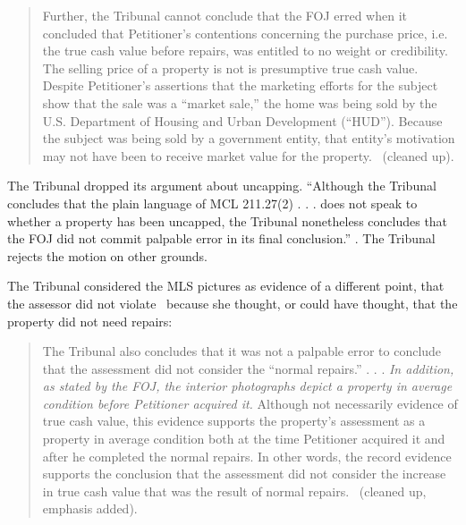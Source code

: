 \documentclass[12pt,\documentclassflag]{michiganCourtOfAppealsBrief}
\begin{document}
\begin{quote}
Further, the Tribunal cannot conclude that the FOJ erred when it
concluded that Petitioner's contentions concerning the purchase price, i.e. the true cash value before repairs, was entitled to no weight or credibility. The selling price of a property is not is presumptive true cash value. Despite Petitioner's assertions that the marketing efforts for the subject show that the sale was a ``market sale,'' the home was
being sold by the U.S. Department of Housing and Urban Development (``HUD''). Because the subject was being sold by a government entity, that entity's motivation may not have been to receive market value for the property. \reconsiderationDenied[2]\ (cleaned up).
\end{quote}

The Tribunal dropped its argument about uncapping. ``Although the Tribunal concludes that the plain language of MCL 211.27(2) . . . does not speak to whether a property has been uncapped, the Tribunal nonetheless concludes that the FOJ did not commit palpable error in its final conclusion.'' \reconsiderationDenied[1-2]. The Tribunal rejects the motion on other grounds. 

The Tribunal considered the MLS pictures as evidence of a different point, that the assessor did not violate \mathieuGast\ because she thought, or could have thought, that the property did not need repairs:

\begin{quote}
  The Tribunal also concludes that it was not a palpable error to conclude that the assessment did not consider the ``normal repairs.'' . . .
  {\em In addition, as stated by the FOJ, the interior photographs depict a property in average condition before Petitioner acquired it.} Although not necessarily evidence of true cash value, this evidence supports the property's assessment as a property in average condition both at the time Petitioner acquired it and after he completed the normal repairs. In other words, the record evidence supports the conclusion that the assessment did not consider the increase in true cash value that was the result of normal repairs. \reconsiderationDenied[2]\ (cleaned up, emphasis added).
\end{quote}
\end{document}
